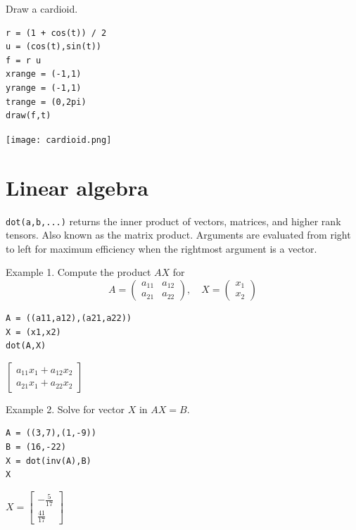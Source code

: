 \documentclass[12pt]{article}
\begin{document}
Draw a cardioid.

{\color{blue}
\begin{verbatim}
r = (1 + cos(t)) / 2
u = (cos(t),sin(t))
f = r u
xrange = (-1,1)
yrange = (-1,1)
trange = (0,2pi)
draw(f,t)
\end{verbatim}}

\begin{center}
\texttt{[image: cardioid.png]}
\end{center}

\newpage

\section{Linear algebra}

\verb$dot(a,b,...)$ returns the inner product of vectors, matrices,
and higher rank tensors.
Also known as the matrix product.
Arguments are evaluated from right to left
for maximum efficiency when the rightmost argument is a vector.

\bigskip

Example 1. Compute the product $AX$ for
\begin{equation*}
A=\begin{pmatrix}a_{11}&a_{12}\\a_{21}&a_{22}\end{pmatrix},
\quad
X=\begin{pmatrix}x_1\\x_2\end{pmatrix}
\end{equation*}

{\color{blue}
\begin{verbatim}
A = ((a11,a12),(a21,a22))
X = (x1,x2)
dot(A,X)
\end{verbatim}
}

$\displaystyle
\begin{bmatrix}
a_{11}x_1+a_{12}x_2
\\[1ex]
a_{21}x_1+a_{22}x_2
\end{bmatrix}
$

\bigskip

Example 2. Solve for vector $X$ in $AX=B$.

{\color{blue}
\begin{verbatim}
A = ((3,7),(1,-9))
B = (16,-22)
X = dot(inv(A),B)
X
\end{verbatim}
}

$\displaystyle
X=
\begin{bmatrix}
-\frac{5}{17}
\\[1ex]
\frac{41}{17}
\end{bmatrix}
$
\end{document}
